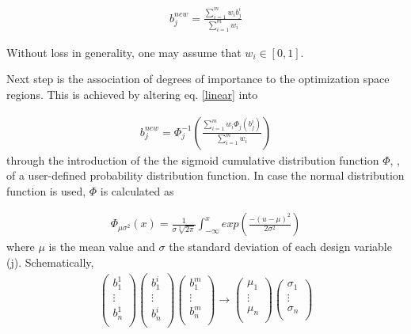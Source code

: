 \begin{eqnarray}
   b_j^{new} = \frac{\sum_{i=1}^{m}w_i b_j^i}{\sum_{i=1}^{m}w_i } 
   \label{linear} 
\end{eqnarray}

Without loss in generality, one may assume that $w_i \in [0,1]$. 

Next step is the association of degrees of importance to the optimization space regions. This is achieved by altering eq. \ref{linear} into


\begin{eqnarray}
   b_j^{new} = \Phi _j^{-1} (\frac{\sum_{i=1}^{m}w_i \Phi _j(b_j^i)}{\sum_{i=1}^{m}w_i }) 
   \label{non-linear} 
\end{eqnarray}
through the introduction of the the sigmoid cumulative distribution function $\Phi$,  \cite{Kiemele}, of a user-defined probability distribution function. In case the normal distribution function is used, $\Phi$ is calculated as

\begin{eqnarray}
   \Phi _{\mu \sigma ^2} (x)= \frac{1}{\sigma\sqrt[2]{2\pi}}\int _{-\infty}^x exp(\frac{-(u-\mu)^2}{2 \sigma^2}) 
   \label{cdf} 
\end{eqnarray}
where $\mu$ is the mean value and $\sigma$ the standard deviation of each design variable (j). Schematically,
\begin{eqnarray}
		\left( {\begin{array}{c}
 		b_1^1  \\
 		\vdots  \\
 		b_n^1	\\
 		\end{array} } \right) 
 		\left( {\begin{array}{c}
 		b_1^i  \\
 		\vdots  \\
 		b_n^i	\\
 		\end{array} } \right)
 		\left( {\begin{array}{c}
 		b_1^m  \\
 		\vdots  \\
 		b_n^m	\\
 		\end{array} } \right) \rightarrow
		\left( {\begin{array}{c}
 		\mu _1  \\
 		\vdots  \\
 		\mu _n  \\
 		\end{array} } \right)
		\left( {\begin{array}{c}
 		\sigma _1  \\
 		\vdots  \\
 		\sigma _n  \\
 		\end{array} } \right)
   \label{cdf-matrix} 
\end{eqnarray}


